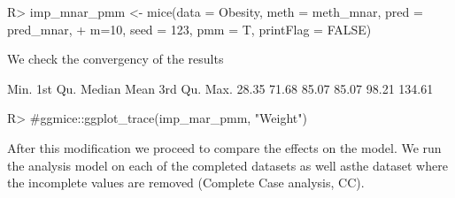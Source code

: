 \documentclass[
]{jss}
\begin{document}
\begin{CodeChunk}
\begin{CodeInput}
R> imp_mnar_pmm <- mice(data = Obesity, meth = meth_mnar, pred = pred_mnar,
+                      m=10, seed = 123, pmm = T,  printFlag = FALSE)
\end{CodeInput}
\end{CodeChunk}

We check the convergency of the results

\begin{CodeChunk}
\begin{CodeOutput}
   Min. 1st Qu.  Median    Mean 3rd Qu.    Max. 
  28.35   71.68   85.07   85.07   98.21  134.61 
\end{CodeOutput}
\begin{CodeInput}
R> #ggmice::ggplot_trace(imp_mar_pmm, "Weight")
\end{CodeInput}
\end{CodeChunk}

After this modification we proceed to compare the effects on the model.
We run the analysis model on each of the completed datasets as well
asthe dataset where the incomplete values are removed (Complete Case
analysis, CC).
\end{document}
